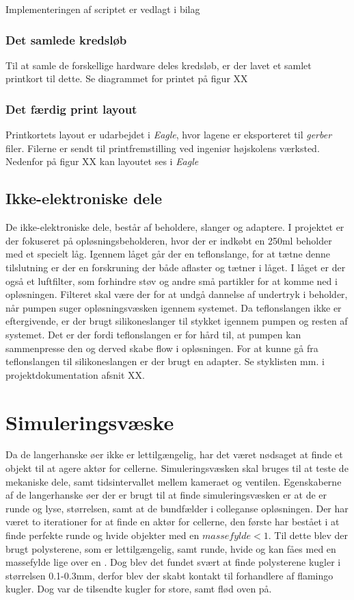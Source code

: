 Implementeringen af scriptet er vedlagt i bilag   

\subsubsection{Det samlede kredsløb}
Til at samle de forskellige hardware deles kredsløb, er der lavet et samlet printkort til dette. Se diagrammet for printet på figur XX

\subsubsection{Det færdig print layout}
Printkortets layout er udarbejdet i \textit{Eagle}, hvor lagene er eksporteret til \textit{gerber} filer. Filerne er sendt til printfremstilling ved ingeniør højskolens værksted. Nedenfor på figur XX kan layoutet ses i \textit{Eagle}

\subsection{Ikke-elektroniske dele}
De ikke-elektroniske dele, består af beholdere, slanger og adaptere. I projektet er der fokuseret på opløsningsbeholderen, hvor der er indkøbt en 250ml beholder med et specielt låg. Igennem låget går der en teflonslange, for at tætne denne tilslutning er der en forskruning der både aflaster og tætner i låget. I låget er der også et luftfilter, som forhindre støv og andre små partikler for at komme ned i opløsningen. Filteret skal være der for at undgå dannelse af undertryk i beholder, når pumpen suger opløsningsvæsken igennem systemet. Da teflonslangen ikke er eftergivende, er der brugt silikoneslanger til stykket igennem pumpen og resten af systemet. Det er der fordi teflonslangen er for hård til, at pumpen kan sammenpresse den og derved skabe flow i opløsningen. For at kunne gå fra teflonslangen til silikoneslangen er der brugt en adapter. Se styklisten mm. i projektdokumentation afsnit XX.

\section{Simuleringsvæske}
\label{sec:simuleringsv}
Da de langerhanske øer ikke er lettilgængelig, har det været nødsaget at finde et objekt til at agere aktør for cellerne. Simuleringsvæsken skal bruges til at teste de mekaniske dele, samt tidsintervallet mellem kameraet og ventilen. Egenskaberne af de langerhanske øer der er brugt til at finde simuleringsvæsken er at de er runde og lyse, størrelsen, samt at de bundfælder i colleganse opløsningen. Der har været to iterationer for at finde en aktør for cellerne, den første har bestået i at finde perfekte runde og hvide objekter med en $massefylde<1$. Til dette blev der brugt polysterene, som er lettilgængelig, samt runde, hvide og kan fåes med en massefylde lige over en . Dog blev det fundet svært at finde polysterene kugler i størrelsen 0.1-0.3mm, derfor blev der skabt kontakt til forhandlere af flamingo kugler. Dog var de tilsendte kugler for store, samt flød oven på. 

